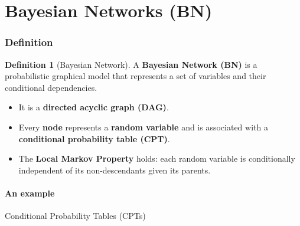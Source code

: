 \documentclass[10pt,UTF8]{article}
\newenvironment{definitionBox}
{
  \begin{tcolorbox}[colback=blue!5!white,colframe=blue!75!black,parbox=false,before
  upper=\par,before lower=\par]}
  {
\end{tcolorbox}}
\theoremstyle{definition}
\newtheorem{definition inner}{Definition}[section]
\newenvironment{definition}[1][]
{
  \begin{definitionBox}
  \begin{definition inner}[#1]\hfill\par}
    {
    \end{definition inner}
\end{definitionBox}}
\theoremstyle{definition}
\newtheorem{theorem inner}{Theorem}[section]
\theoremstyle{definition}
\newtheorem*{proof inner}{\textit{Proof}}
\theoremstyle{plain}
\newtheorem{tip inner}{Tip}[section]
\theoremstyle{remark}
\begin{document}
\part*{Bayesian Networks (BN)}

\section{Definition}

\begin{definition}[Bayesian Network]
  A \textbf{Bayesian Network (BN)} is a probabilistic graphical model
  that represents a set of variables and their conditional dependencies.
  \begin{itemize}
    \item It is a \textbf{directed acyclic graph (DAG)}.
    \item Every \textbf{node} represents a \textbf{random variable}
      and is associated with a \textbf{conditional probability table (CPT)}.
    \item The \textbf{Local Markov Property} holds: each random
      variable is conditionally independent of its non-descendants
      given its parents.
  \end{itemize}
\end{definition}

\subsection*{An example}

\begin{center}
\end{center}

\subparagraph{Conditional Probability Tables (CPTs)}
\end{document}
